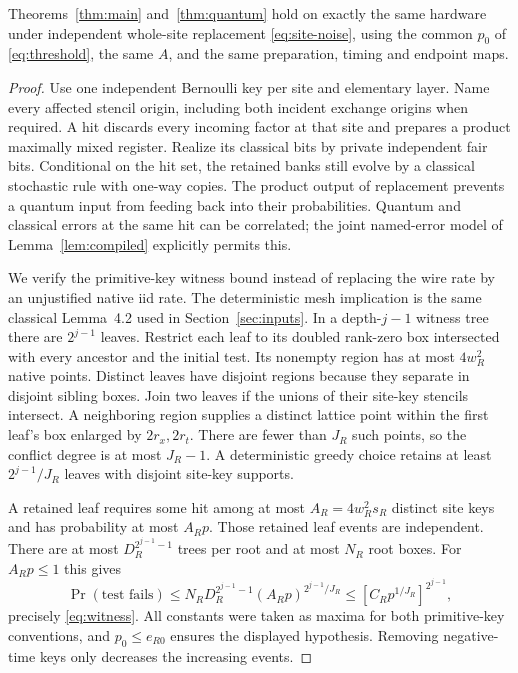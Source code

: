 \begin{maintheorem}\label{thm:site}
Theorems~\ref{thm:main} and~\ref{thm:quantum} hold on exactly the same hardware under independent whole-site replacement \eqref{eq:site-noise}, using the common $p_0$ of \eqref{eq:threshold}, the same $A$, and the same preparation, timing and endpoint maps.
\end{maintheorem}
\begin{proof}
Use one independent Bernoulli key per site and elementary layer. Name every affected stencil origin, including both incident exchange origins when required. A hit discards every incoming factor at that site and prepares a product maximally mixed register. Realize its classical bits by private independent fair bits. Conditional on the hit set, the retained banks still evolve by a classical stochastic rule with one-way copies. The product output of replacement prevents a quantum input from feeding back into their probabilities. Quantum and classical errors at the same hit can be correlated; the joint named-error model of Lemma~\ref{lem:compiled} explicitly permits this.

We verify the primitive-key witness bound instead of replacing the wire rate by an unjustified native iid rate. The deterministic mesh implication is the same classical Lemma~4.2 used in Section~\ref{sec:inputs}. In a depth-$j-1$ witness tree there are $2^{j-1}$ leaves. Restrict each leaf to its doubled rank-zero box intersected with every ancestor and the initial test. Its nonempty region has at most $4w_R^2$ native points. Distinct leaves have disjoint regions because they separate in disjoint sibling boxes. Join two leaves if the unions of their site-key stencils intersect. A neighboring region supplies a distinct lattice point within the first leaf's box enlarged by $2r_x,2r_t$. There are fewer than $J_R$ such points, so the conflict degree is at most $J_R-1$. A deterministic greedy choice retains at least $2^{j-1}/J_R$ leaves with disjoint site-key supports.

A retained leaf requires some hit among at most $A_R=4w_R^2s_R$ distinct site keys and has probability at most $A_Rp$. Those retained leaf events are independent. There are at most $D_R^{2^{j-1}-1}$ trees per root and at most $N_R$ root boxes. For $A_Rp\le1$ this gives
\[
 \Pr(\text{test fails})\le
 N_RD_R^{2^{j-1}-1}(A_Rp)^{2^{j-1}/J_R}
 \le[C_Rp^{1/J_R}]^{2^{j-1}},
\]
precisely \eqref{eq:witness}. All constants were taken as maxima for both primitive-key conventions, and $p_0\le e_{R0}$ ensures the displayed hypothesis. Removing negative-time keys only decreases the increasing events.


\end{proof}

